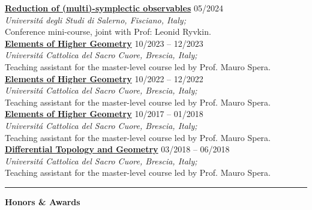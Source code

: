 \documentclass[a4paper]{article}
\newcommand{\block}[1]{\hrule \vspace{0.2cm} \textbf{\Large #1} \vspace{0.2cm}}
\newcommand{\voice}[5]{\href{#4}{\textbf{#1}} \hfill #2 \\ \textit{#3} \\ {\small #5} \vspace{0.2cm} \\}
\begin{document}
    
    \voice{Reduction of (multi)-symplectic observables}
        {05/2024}
        {Universit\'a degli Studi di Salerno, Fisciano, Italy;}
        {https://www.antoniomiti.it/teaching/Obs-Constraint-2024/}       
        {Conference mini-course, joint with Prof: Leonid Ryvkin.}
    \voice{Elements of Higher Geometry}
        {10/2023 -- 12/2023}
        {Universit\'a Cattolica del Sacro Cuore, Brescia, Italy;}
        {https://dmf.unicatt.it/miti/teaching/IstGeoSup-22-23/}       
        {Teaching assistant for the master-level course led by Prof. Mauro Spera.}
    \voice{Elements of Higher Geometry}
        {10/2022 -- 12/2022}
        {Universit\'a Cattolica del Sacro Cuore, Brescia, Italy;}
        {https://dmf.unicatt.it/miti/teaching/IstGeoSup-22-23/}       
        {Teaching assistant for the master-level course led by Prof. Mauro Spera.}
    \voice{Elements of Higher Geometry}
        {10/2017 -- 01/2018}
        {Universit\'a Cattolica del Sacro Cuore, Brescia, Italy;}
        {http://docenti.unicatt.it/web/html/index.html\#/programmi/BS/2D9B/75017/2017/21065/MIH341/ita}       
        {Teaching assistant for the master-level course led by Prof. Mauro Spera.}
    \voice{Differential Topology and Geometry}
        {03/2018 -- 06/2018}
        {Universit\'a Cattolica del Sacro Cuore, Brescia, Italy;}
        {http://docenti.unicatt.it/web/html/index.html\#/programmi/BS/2D8B/75017/2017/21065/MGH344/ita}       
        {Teaching assistant for the master-level course led by Prof. Mauro Spera.}





    \block{Honors \& Awards}
\end{document}
